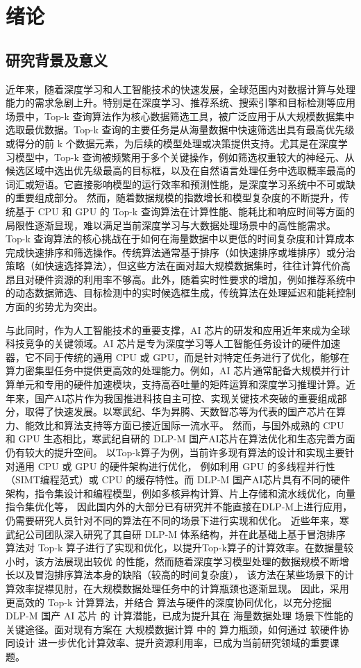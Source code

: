 \chapter{绪论}
\section{研究背景及意义}
近年来，随着深度学习和人工智能技术的快速发展，全球范围内对数据计算与处理能力的需求急剧上升。特别是在深度学习、推荐系统、搜索引擎和目标检测等应用场景中，Top-k 查询算法作为核心数据筛选工具，被广泛应用于从大规模数据集中选取最优数据。Top-k 查询的主要任务是从海量数据中快速筛选出具有最高优先级或得分的前 k 个数据元素，为后续的模型处理或决策提供支持。尤其是在深度学习模型中，Top-k 查询被频繁用于多个关键操作，例如筛选权重较大的神经元、从候选区域中选出优先级最高的目标框，以及在自然语言处理任务中选取概率最高的词汇或短语。它直接影响模型的运行效率和预测性能，是深度学习系统中不可或缺的重要组成部分。
然而，随着数据规模的指数增长和模型复杂度的不断提升，传统基于 CPU 和 GPU 的 Top-k 查询算法在计算性能、能耗比和响应时间等方面的局限性逐渐显现，难以满足当前深度学习与大数据处理场景中的高性能需求。Top-k 查询算法的核心挑战在于如何在海量数据中以更低的时间复杂度和计算成本完成快速排序和筛选操作。传统算法通常基于排序（如快速排序或堆排序）或分治策略（如快速选择算法），但这些方法在面对超大规模数据集时，往往计算代价高昂且对硬件资源的利用率不够高。此外，随着实时性要求的增加，例如推荐系统中的动态数据筛选、目标检测中的实时候选框生成，传统算法在处理延迟和能耗控制方面的劣势尤为突出。

与此同时，作为人工智能技术的重要支撑，AI 芯片的研发和应用近年来成为全球科技竞争的关键领域。AI 芯片是专为深度学习等人工智能任务设计的硬件加速器，它不同于传统的通用 CPU 或 GPU，而是针对特定任务进行了优化，能够在算力密集型任务中提供更高效的处理能力。例如，AI 芯片通常配备大规模并行计算单元和专用的硬件加速模块，支持高吞吐量的矩阵运算和深度学习推理计算。近年来，国产AI芯片作为我国推进科技自主可控、实现关键技术突破的重要组成部分，取得了快速发展。以寒武纪、华为昇腾、天数智芯等为代表的国产芯片在算力、能效比和算法支持等方面已接近国际一流水平。
然而，与国外成熟的 CPU 和 GPU 生态相比，寒武纪自研的 DLP-M 国产AI芯片在算法优化和生态完善方面仍有较大的提升空间。
以Top-k算子为例，当前许多现有算法的设计和实现主要针对通用 CPU 或 GPU 的硬件架构进行优化，
例如利用 GPU 的多线程并行性（SIMT编程范式）或 CPU 的缓存特性。而 DLP-M 国产AI芯片具有不同的硬件架构，指令集设计和编程模型，例如多核异构计算、片上存储和流水线优化，向量指令集优化等，
因此国内外的大部分已有研究并不能直接在DLP-M上进行应用，仍需要研究人员针对不同的算法在不同的场景下进行实现和优化。
近些年来，寒武纪公司团队深入研究了其自研 DLP-M 体系结构，并在此基础上基于冒泡排序
算法对 Top-k 算子进行了实现和优化，以提升Top-k算子的计算效率。在数据量较小时，该方法展现出较优
的性能，然而随着深度学习模型处理的数据规模不断增长以及冒泡排序算法本身的缺陷（较高的时间复杂度），
该方法在某些场景下的计算效率捉襟见肘，在大规模数据处理任务中的计算瓶颈也逐渐显现。
因此，采用更高效的 Top-k 计算算法，并结合 算法与硬件的深度协同优化，以充分挖掘 DLP-M 国产 AI 芯片 的 计算潜能，已成为提升其在 海量数据处理 场景下性能的关键途径。面对现有方案在 大规模数据计算 中的 算力瓶颈，如何通过 软硬件协同设计 进一步优化计算效率、提升资源利用率，已成为当前研究领域的重要课题。

